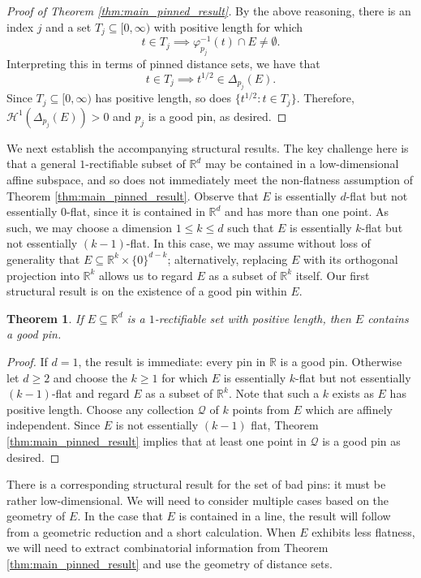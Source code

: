 \documentclass[12pt]{amsart}
\newtheorem{theorem}{Theorem}[section]
\theoremstyle{definition}
\numberwithin{equation}{section}
\begin{document}
\begin{proof}[Proof of Theorem \ref{thm:main_pinned_result}]
By the above reasoning, there is an index $j$ and a set $T_j \subseteq [0, \infty)$ with positive length for which 
$$t \in T_j \implies \varphi_{p_j}^{-1}(t) \cap E \ne \emptyset.$$
Interpreting this in terms of pinned distance sets, we have that 
$$t \in T_j \implies t^{1/2} \in \Delta_{p_j}(E).$$
Since $T_j \subseteq [0, \infty)$ has positive length, so does $\{t^{1/2} : t \in T_j\}.$ Therefore, $\mathcal H^1(\Delta_{p_j}(E)) > 0$ and $p_j$ is a good pin, as desired.
\end{proof}

We next establish the accompanying structural results.
The key challenge here is that a general $1$-rectifiable subset of $\mathbb{R}^d$ may be contained in a low-dimensional affine subspace, and so does not immediately meet the non-flatness assumption of Theorem \ref{thm:main_pinned_result}. Observe that $E$ is essentially $d$-flat but not essentially $0$-flat, since it is contained in $\mathbb{R}^d$ and has more than one point. As such, we may choose a dimension $1 \le k \le d$ such that $E$ is essentially $k$-flat but not essentially $(k - 1)$-flat. In this case, we may assume without loss of generality that $E \subseteq \mathbb{R}^k \times \{0\}^{d - k}$; alternatively, replacing $E$ with its orthogonal projection into $\mathbb{R}^k$ allows us to regard $E$ as a subset of $\mathbb{R}^k$ itself. Our first structural result is on the existence of a good pin within $E$.

\begin{theorem}\label{thm:pinned_distance_structural_good}
If $E \subseteq \mathbb{R}^d$ is a $1$-rectifiable set with positive length, then $E$ contains a good pin.
\end{theorem}

\begin{proof}
If $d = 1$, the result is immediate: every pin in $\mathbb{R}$ is a good pin. Otherwise let $d \ge 2$ and choose the $k \ge 1$ for which $E$ is essentially $k$-flat but not essentially $(k - 1)$-flat and regard $E$ as a subset of $\mathbb{R}^k$. Note that such a $k$ exists as $E$ has positive length. Choose any collection $\mathcal{Q}$ of $k$ points from $E$ which are affinely independent. Since $E$ is not essentially $(k - 1)$ flat, Theorem \ref{thm:main_pinned_result} implies that at least one point in $\mathcal{Q}$ is a good pin as desired.
\end{proof}

There is a corresponding structural result for the set of bad pins: it must be rather low-dimensional. We will need to consider multiple cases based on the geometry of $E$. In the case that $E$ is contained in a line, the result will follow from a geometric reduction and a short calculation. When $E$ exhibits less flatness, we will need to extract combinatorial information from Theorem \ref{thm:main_pinned_result} and use the geometry of distance sets. 
\end{document}
